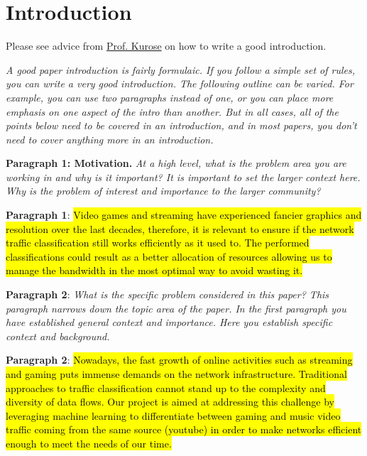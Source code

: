 \section{Introduction}
\label{sec:intro}

Please see advice from \href{https://www.cs.columbia.edu/~hgs/etc/intro-style.html}{Prof. Kurose} on how to write a good introduction. 


\textit{A good paper introduction is fairly formulaic. If you follow a simple set of rules, you can write a very good introduction. The following outline can be varied. For example, you can use two paragraphs instead of one, or you can place more emphasis on one aspect of the intro than another. But in all cases, all of the points below need to be covered in an introduction, and in most papers, you don't need to cover anything more in an introduction.}

\textbf{Paragraph 1: Motivation.} \textit{At a high level, what is the problem area you are working in and why is it important? It is important to set the larger context here. Why is the problem of interest and importance to the larger community?}

\textbf{Paragraph 1}: \hl{Video games and streaming have experienced fancier graphics and resolution over the last decades, therefore, it is relevant to ensure if the network traffic classification still works efficiently as it used to. The performed classifications could result as a better allocation of resources allowing us to manage the bandwidth in the most optimal way to avoid wasting it. }

\textbf{Paragraph 2}: \textit{What is the specific problem considered in this paper? This paragraph narrows down the topic area of the paper. In the first paragraph you have established general context and importance. Here you establish specific context and background.}

\textbf{Paragraph 2}: \hl{Nowadays, the fast growth of online activities such as streaming and gaming puts immense demands on the network infrastructure. Traditional approaches to traffic classification cannot stand up to the complexity and diversity of data flows. Our project is aimed at addressing this challenge by leveraging machine learning to differentiate between gaming and music video traffic coming from the same source (youtube) in order to make networks efficient enough to meet the needs of our time.}

